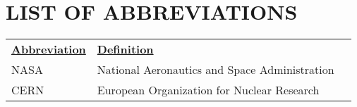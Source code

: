 ~\pagebreak
\chapter*{LIST OF ABBREVIATIONS}

\hspace{-1.35cm}
\begin{tabularx}{\textwidth}{@{}p{} p{} X@{}}
\noindent\textbf{\underline{Abbreviation}} & \textbf{\underline{Definition}} \\

NASA   	& National Aeronautics and Space Administration \\
CERN	& European Organization for Nuclear Research

\end{tabularx}
~\pagebreak